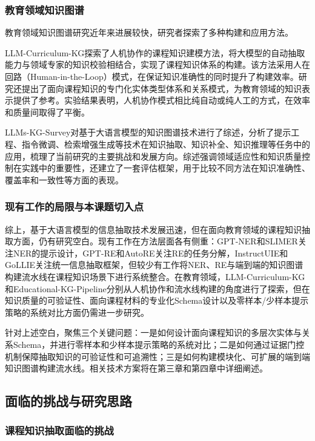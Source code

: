\subsubsection{教育领域知识图谱}

教育领域知识图谱研究近年来进展较快，研究者探索了多种构建和应用方法。

LLM-Curriculum-KG\cite{llm_curriculum_kg_2025}探索了人机协作的课程知识建模方法，将大模型的自动抽取能力与领域专家的知识校验相结合，实现了课程知识体系的构建。该方法采用人在回路（Human-in-the-Loop）模式，在保证知识准确性的同时提升了构建效率。研究还提出了面向课程知识的专门化实体类型体系和关系模式，为教育领域的知识表示提供了参考。实验结果表明，人机协作模式相比纯自动或纯人工的方式，在效率和质量间取得了平衡。

LLMs-KG-Survey\cite{llms_kg_survey_2023}对基于大语言模型的知识图谱技术进行了综述，分析了提示工程、指令微调、检索增强生成等技术在知识抽取、知识补全、知识推理等任务中的应用，梳理了当前研究的主要挑战和发展方向。综述强调领域适应性和知识质量控制在实践中的重要性，还建立了一套评估框架，用于比较不同方法在知识准确性、覆盖率和一致性等方面的表现。

\subsubsection{现有工作的局限与本课题切入点}

综上，基于大语言模型的信息抽取技术发展迅速，但在面向教育领域的课程知识抽取方面，仍有研究空白。现有工作在方法层面各有侧重：GPT-NER和SLIMER关注NER的提示设计，GPT-RE和AutoRE关注RE的任务分解，InstructUIE和GoLLIE关注统一信息抽取框架，但较少有工作将NER、RE与端到端的知识图谱构建流水线在课程知识场景下进行系统整合。在教育领域，LLM-Curriculum-KG和Educational-KG-Pipeline分别从人机协作和流水线构建的角度进行了探索，但在知识质量的可验证性、面向课程材料的专业化Schema设计以及零样本/少样本提示策略的系统对比方面仍需进一步研究。

针对上述空白，聚焦三个关键问题：一是如何设计面向课程知识的多层次实体与关系Schema，并进行零样本和少样本提示策略的系统对比；二是如何通过证据门控机制保障抽取知识的可验证性和可追溯性；三是如何构建模块化、可扩展的端到端知识图谱构建流水线。相关技术方案将在第三章和第四章中详细阐述。

\subsection{面临的挑战与研究思路}

\subsubsection{课程知识抽取面临的挑战}

